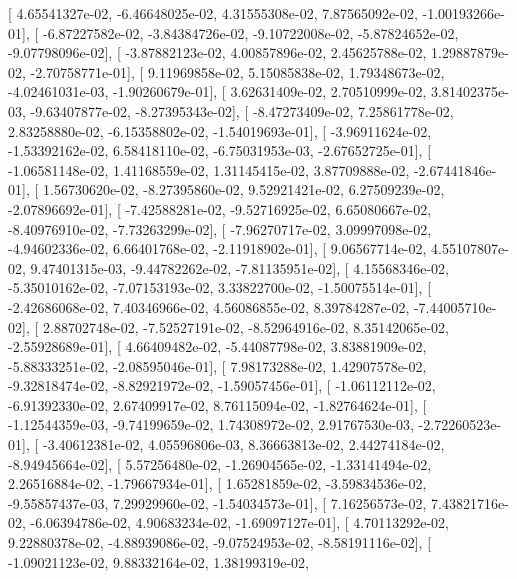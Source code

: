 \documentclass{article}
\begin{document}
       [  4.65541327e-02,  -6.46648025e-02,   4.31555308e-02,
          7.87565092e-02,  -1.00193266e-01],
       [ -6.87227582e-02,  -3.84384726e-02,  -9.10722008e-02,
         -5.87824652e-02,  -9.07798096e-02],
       [ -3.87882123e-02,   4.00857896e-02,   2.45625788e-02,
          1.29887879e-02,  -2.70758771e-01],
       [  9.11969858e-02,   5.15085838e-02,   1.79348673e-02,
         -4.02461031e-03,  -1.90260679e-01],
       [  3.62631409e-02,   2.70510999e-02,   3.81402375e-03,
         -9.63407877e-02,  -8.27395343e-02],
       [ -8.47273409e-02,   7.25861778e-02,   2.83258880e-02,
         -6.15358802e-02,  -1.54019693e-01],
       [ -3.96911624e-02,  -1.53392162e-02,   6.58418110e-02,
         -6.75031953e-03,  -2.67652725e-01],
       [ -1.06581148e-02,   1.41168559e-02,   1.31145415e-02,
          3.87709888e-02,  -2.67441846e-01],
       [  1.56730620e-02,  -8.27395860e-02,   9.52921421e-02,
          6.27509239e-02,  -2.07896692e-01],
       [ -7.42588281e-02,  -9.52716925e-02,   6.65080667e-02,
         -8.40976910e-02,  -7.73263299e-02],
       [ -7.96270717e-02,   3.09997098e-02,  -4.94602336e-02,
          6.66401768e-02,  -2.11918902e-01],
       [  9.06567714e-02,   4.55107807e-02,   9.47401315e-03,
         -9.44782262e-02,  -7.81135951e-02],
       [  4.15568346e-02,  -5.35010162e-02,  -7.07153193e-02,
          3.33822700e-02,  -1.50075514e-01],
       [ -2.42686068e-02,   7.40346966e-02,   4.56086855e-02,
          8.39784287e-02,  -7.44005710e-02],
       [  2.88702748e-02,  -7.52527191e-02,  -8.52964916e-02,
          8.35142065e-02,  -2.55928689e-01],
       [  4.66409482e-02,  -5.44087798e-02,   3.83881909e-02,
         -5.88333251e-02,  -2.08595046e-01],
       [  7.98173288e-02,   1.42907578e-02,  -9.32818474e-02,
         -8.82921972e-02,  -1.59057456e-01],
       [ -1.06112112e-02,  -6.91392330e-02,   2.67409917e-02,
          8.76115094e-02,  -1.82764624e-01],
       [ -1.12544359e-03,  -9.74199659e-02,   1.74308972e-02,
          2.91767530e-03,  -2.72260523e-01],
       [ -3.40612381e-02,   4.05596806e-03,   8.36663813e-02,
          2.44274184e-02,  -8.94945664e-02],
       [  5.57256480e-02,  -1.26904565e-02,  -1.33141494e-02,
          2.26516884e-02,  -1.79667934e-01],
       [  1.65281859e-02,  -3.59834536e-02,  -9.55857437e-03,
          7.29929960e-02,  -1.54034573e-01],
       [  7.16256573e-02,   7.43821716e-02,  -6.06394786e-02,
          4.90683234e-02,  -1.69097127e-01],
       [  4.70113292e-02,   9.22880378e-02,  -4.88939086e-02,
         -9.07524953e-02,  -8.58191116e-02],
       [ -1.09021123e-02,   9.88332164e-02,   1.38199319e-02,
\end{document}
